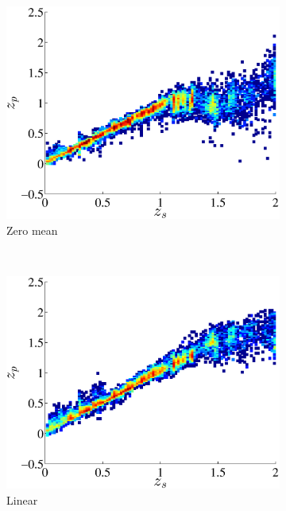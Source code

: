\documentclass[useAMS,usenatbib,fleqn]{mn2e}
\begin{document}
\begin{figure}
       \begin{subfigure}[b]{0.3\columnwidth}
                \includegraphics[width=\textwidth]{figures/22_0.eps}
                \caption{Zero mean}
        \end{subfigure}
        ~
        \begin{subfigure}[b]{0.3\columnwidth}
                \includegraphics[width=\textwidth]{figures/22_L.eps}
                \caption{Linear}
        \end{subfigure}
        ~
        \begin{subfigure}[b]{0.3\columnwidth}

\end{subfigure}
\end{figure}
\end{document}
